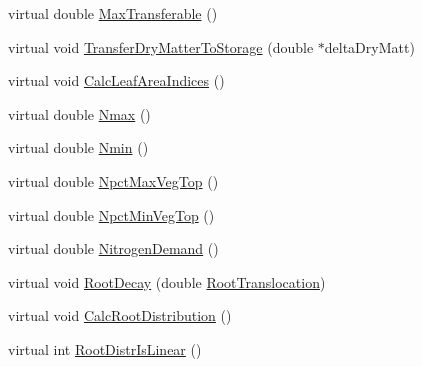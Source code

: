 \begin{DoxyCompactItemize}
virtual double \hyperlink{classcrop_ab0b92e4e8ee085757f97ebffb299a721}{MaxTransferable} ()
\item 
virtual void \hyperlink{classcrop_aa93103e69836afc4fb23c1a29b15584f}{TransferDryMatterToStorage} (double $\ast$deltaDryMatt)
\item 
virtual void \hyperlink{classcrop_a14395e2b72c28aaf9dc729fcd0d3b1c8}{CalcLeafAreaIndices} ()
\item 
virtual double \hyperlink{classcrop_a6416f0baf1364f2cf28f312584c39f73}{Nmax} ()
\item 
virtual double \hyperlink{classcrop_adc9f2a384dfd4be26746b822c4324f37}{Nmin} ()
\item 
virtual double \hyperlink{classcrop_a32e4925865c2310ccc9efc0df1cec1bb}{NpctMaxVegTop} ()
\item 
virtual double \hyperlink{classcrop_a10c59f3f5b94ba41a4678e68d6e559b2}{NpctMinVegTop} ()
\item 
virtual double \hyperlink{classcrop_a7f8a309f89bee5db02055897d0a717be}{NitrogenDemand} ()
\item 
virtual void \hyperlink{classcrop_ae8be0fd1bc438d926ce68942cb0886a0}{RootDecay} (double \hyperlink{classcrop_a15b020b5308e854371c7919b1ebe64ab}{RootTranslocation})
\item 
virtual void \hyperlink{classcrop_a84819af6b3132d798a56acd9c78dfbe1}{CalcRootDistribution} ()
\item 
virtual int \hyperlink{classcrop_a47f0d5b8da50f8daae81b4897d11cda5}{RootDistrIsLinear} ()
\end{DoxyCompactItemize}
